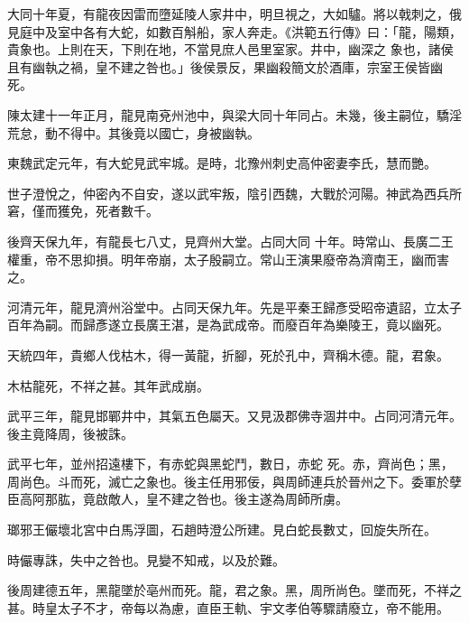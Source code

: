 \begin{pinyinscope}
 大同十年夏，有龍夜因雷而墮延陵人家井中，明旦視之，大如驢。將以戟刺之，俄見庭中及室中各有大蛇，如數百斛船，家人奔走。《洪範五行傳》曰：「龍，陽類，貴象也。上則在天，下則在地，不當見庶人邑里室家。井中，幽深之
 象也，諸侯且有幽執之禍，皇不建之咎也。」後侯景反，果幽殺簡文於酒庫，宗室王侯皆幽死。



 陳太建十一年正月，龍見南兗州池中，與梁大同十年同占。未幾，後主嗣位，驕淫荒怠，動不得中。其後竟以國亡，身被幽執。



 東魏武定元年，有大蛇見武牢城。是時，北豫州刺史高仲密妻李氏，慧而艷。



 世子澄悅之，仲密內不自安，遂以武牢叛，陰引西魏，大戰於河陽。神武為西兵所窘，僅而獲免，死者數千。



 後齊天保九年，有龍長七八丈，見齊州大堂。占同大同
 十年。時常山、長廣二王權重，帝不思抑損。明年帝崩，太子殷嗣立。常山王演果廢帝為濟南王，幽而害之。



 河清元年，龍見濟州浴堂中。占同天保九年。先是平秦王歸彥受昭帝遺詔，立太子百年為嗣。而歸彥遂立長廣王湛，是為武成帝。而廢百年為樂陵王，竟以幽死。



 天統四年，貴鄉人伐枯木，得一黃龍，折腳，死於孔中，齊稱木德。龍，君象。



 木枯龍死，不祥之甚。其年武成崩。



 武平三年，龍見邯鄲井中，其氣五色屬天。又見汲郡佛寺涸井中。占同河清元年。後主竟降周，後被誅。



 武平七年，並州招遠樓下，有赤蛇與黑蛇鬥，數日，赤蛇
 死。赤，齊尚色；黑，周尚色。斗而死，滅亡之象也。後主任用邪佞，與周師連兵於晉州之下。委軍於孽臣高阿那肱，竟啟敵人，皇不建之咎也。後主遂為周師所虜。



 瑯邪王儼壞北宮中白馬浮圖，石趙時澄公所建。見白蛇長數丈，回旋失所在。



 時儼專誅，失中之咎也。見變不知戒，以及於難。



 後周建德五年，黑龍墜於亳州而死。龍，君之象。黑，周所尚色。墜而死，不祥之甚。時皇太子不才，帝每以為慮，直臣王軌、宇文孝伯等驟請廢立，帝不能用。




\end{pinyinscope}
